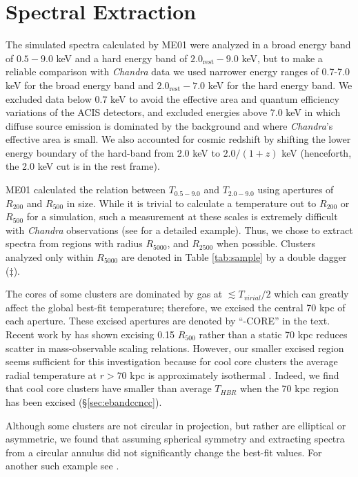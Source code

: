 \section{Spectral Extraction}
\label{sec:ebandextraction}

The simulated spectra calculated by ME01 were analyzed in a broad
energy band of $0.5-9.0$ keV and a hard energy band of
$2.0_{\mathrm{rest}}-9.0$ keV, but to make a reliable comparison with
{\it{Chandra}} data we used narrower energy ranges of 0.7-7.0 keV for
the broad energy band and $2.0_{\mathrm{rest}}-7.0$ keV for the hard
energy band. We excluded data below $0.7$ keV to avoid the effective
area and quantum efficiency variations of the ACIS detectors, and
excluded energies above $7.0$ keV in which diffuse source emission is
dominated by the background and where {\it{Chandra}}'s effective area
is small. We also accounted for cosmic redshift by shifting the lower
energy boundary of the hard-band from 2.0 keV to $2.0/(1+z)$ keV
(henceforth, the 2.0 keV cut is in the rest frame).

ME01 calculated the relation between $T_{0.5-9.0}$ and $T_{2.0-9.0}$
using apertures of $R_{200}$ and $R_{500}$ in size. While it is
trivial to calculate a temperature out to $R_{200}$ or $R_{500}$ for a
simulation, such a measurement at these scales is extremely difficult
with {\it Chandra} observations (see \citet{2005ApJ...628..655V} for a
detailed example). Thus, we chose to extract spectra from regions with
radius $R_{5000}$, and $R_{2500}$ when possible. Clusters analyzed
only within $R_{5000}$ are denoted in Table \ref{tab:sample} by a
double dagger ($\ddagger$).

The cores of some clusters are dominated by gas at $\lesssim
T_{virial}/2$ which can greatly affect the global best-fit
temperature; therefore, we excised the central 70 kpc of each
aperture. These excised apertures are denoted by ``-CORE'' in the
text. Recent work by \citet{2007ApJ...668..772M} has shown excising
0.15 $R_{500}$ rather than a static 70 kpc reduces scatter in
mass-observable scaling relations. However, our smaller excised region
seems sufficient for this investigation because for cool core clusters
the average radial temperature at $r > 70$ kpc is approximately
isothermal \citep{2005ApJ...628..655V}. Indeed, we find that cool core
clusters have smaller than average $T_{HBR}$ when the 70 kpc region
has been excised (\S\ref{sec:ebandccncc}).

Although some clusters are not circular in projection, but rather are
elliptical or asymmetric, we found that assuming spherical symmetry
and extracting spectra from a circular annulus did not significantly
change the best-fit values. For another such example see
\citet{2005MNRAS.359.1481B}.

